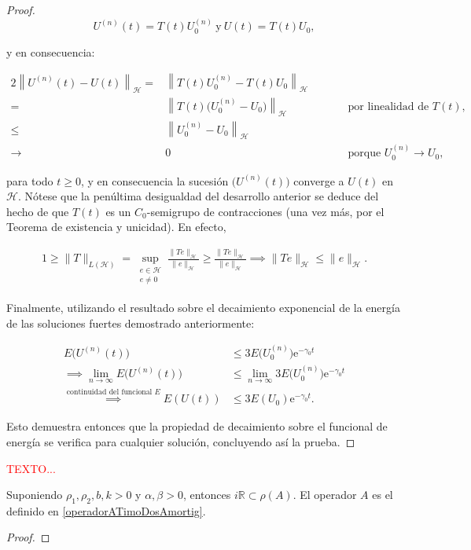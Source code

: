 \begin{proof}
    \[U^{(n)}(t) = T(t)U_0^{(n)} \ \text{y} \ U(t) = T(t)U_0,\]

    y en consecuencia:

    \begin{alignat*}{2}
        \left\| U^{(n)}(t) - U(t) \right\|_{\mathcal H}
        =& \left\| T(t)U_0^{(n)} - T(t)U_0 \right\|_{\mathcal H} \\[2mm]
        =& \left\| T(t)\bigl(U_0^{(n)} - U_0\bigr) \right\|_{\mathcal H}
        &\qquad& \text{por linealidad de } T(t), \\[2mm]
        \leq& \left\| U_0^{(n)} - U_0 \right\|_{\mathcal H} \\
        \longrightarrow & 0
        && \text{porque } U^{(n)}_0 \rightarrow U_0,
    \end{alignat*}

    para todo $t \geq 0$, y en consecuencia la sucesión $\Big(U^{(n)}(t)\Big)$ converge a $U(t)$ en $\mathcal{H}$. Nótese que la penúltima desigualdad del desarrollo anterior se deduce del hecho de que $T(t)$ es un $C_0$-semigrupo de contracciones (una vez más, por el Teorema de existencia y unicidad). En efecto,

    \begin{align*}
        1 \geq \lVert T \rVert_{L(\mathcal{H})} = \sup_{\substack{e \in \mathcal{H} \\ e \neq 0}} \frac{\lVert Te \rVert_{\mathcal{H}}}{\lVert e \rVert_{\mathcal{H}}} \geq \frac{\lVert Te \rVert_{\mathcal{H}}}{\lVert e \rVert_{\mathcal{H}}} \implies \lVert Te\rVert_{\mathcal{H}} \leq \lVert e\rVert_{\mathcal{H}}.
    \end{align*}

    Finalmente, utilizando el resultado sobre el decaimiento exponencial de la energía de las soluciones fuertes demostrado anteriormente:

    \begin{align*}
        E\Big(U^{(n)}(t)\Big) &\leq 3E\Big(U^{(n)}_0\Big)\mathrm{e}^{-\gamma_0 t}\\
        \implies \lim_{n\rightarrow \infty}E\Big(U^{(n)}(t)\Big) &\leq \lim_{n\rightarrow \infty}3E\Big(U^{(n)}_0\Big)\mathrm{e}^{-\gamma_0 t}\\
        \overset{\text{continuidad del funcional }E}{\implies} E(U(t)) &\leq 3E(U_0)\mathrm{e}^{-\gamma_0 t}.
    \end{align*}

    Esto demuestra entonces que la propiedad de decaimiento sobre el funcional de energía se verifica para cualquier solución, concluyendo así la prueba.
\end{proof}

\textcolor{red}{TEXTO...}

\begin{Lema}[(Resolvente de $A$)]
\label{ch:TimoshenkoFric:lemma:resolventeA}
    
    Suponiendo $\rho_1, \rho_2, b, k > 0$ y $\alpha,\beta > 0$, entonces $i\mathbb{R} \subset \rho(A)$. El operador $A$ es el definido en \ref{operadorATimoDosAmortig}.
\end{Lema}

\begin{proof}
    
\end{proof}
